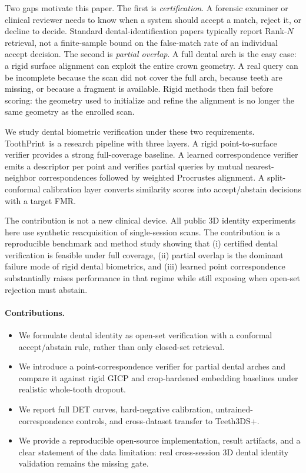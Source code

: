 \documentclass[10pt,twocolumn]{article}
\newcommand{\method}{ToothPrint}
\begin{document}
Two gaps motivate this paper. The first is \emph{certification}. A forensic examiner or clinical reviewer needs to know when a system should accept a match, reject it, or decline to decide. Standard dental-identification papers typically report Rank-$N$ retrieval, not a finite-sample bound on the false-match rate of an individual accept decision. The second is \emph{partial overlap}. A full dental arch is the easy case: a rigid surface alignment can exploit the entire crown geometry. A real query can be incomplete because the scan did not cover the full arch, because teeth are missing, or because a fragment is available. Rigid methods then fail before scoring: the geometry used to initialize and refine the alignment is no longer the same geometry as the enrolled scan.

We study dental biometric verification under these two requirements. \method\ is a research pipeline with three layers. A rigid point-to-surface verifier provides a strong full-coverage baseline. A learned correspondence verifier emits a descriptor per point and verifies partial queries by mutual nearest-neighbor correspondences followed by weighted Procrustes alignment. A split-conformal calibration layer converts similarity scores into accept/abstain decisions with a target FMR.

The contribution is not a new clinical device. All public 3D identity experiments here use synthetic reacquisition of single-session scans. The contribution is a reproducible benchmark and method study showing that (i) certified dental verification is feasible under full coverage, (ii) partial overlap is the dominant failure mode of rigid dental biometrics, and (iii) learned point correspondence substantially raises performance in that regime while still exposing when open-set rejection must abstain.

\paragraph{Contributions.}
\begin{itemize}
  \item We formulate dental identity as open-set verification with a conformal accept/abstain rule, rather than only closed-set retrieval.
  \item We introduce a point-correspondence verifier for partial dental arches and compare it against rigid GICP and crop-hardened embedding baselines under realistic whole-tooth dropout.
  \item We report full DET curves, hard-negative calibration, untrained-correspondence controls, and cross-dataset transfer to Teeth3DS+.
  \item We provide a reproducible open-source implementation, result artifacts, and a clear statement of the data limitation: real cross-session 3D dental identity validation remains the missing gate.
\end{itemize}
\end{document}
